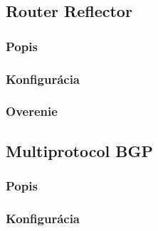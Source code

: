 \documentclass[12pt,twoside,a4paper]{report}
\begin{document}
\paragraph{}






\subsection{Router Reflector}
\subsubsection{Popis}
\paragraph{}

\subsubsection{Konfigurácia}
\paragraph{}

\subsubsection{Overenie}
\paragraph{}






\subsection{Multiprotocol BGP}
\subsubsection{Popis}
\paragraph{}

\subsubsection{Konfigurácia}
\paragraph{}
\end{document}
